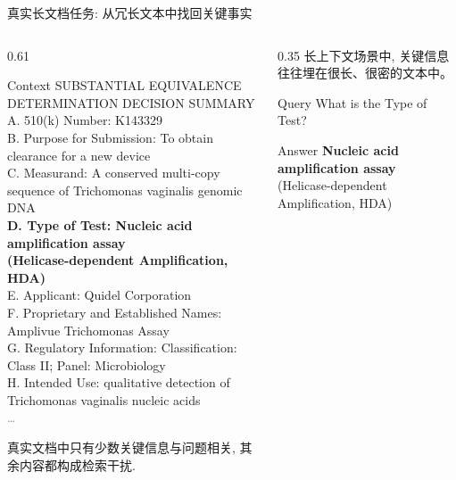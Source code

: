 
\begin{frame}
  \titlepage
\end{frame}

\begin{frame}{真实长文档任务: 从冗长文本中找回关键事实}
  \centering
  \begin{minipage}{0.92\textwidth}
  \small
  \begin{columns}[T,onlytextwidth]
    \begin{column}{0.61\linewidth}
      \begin{block}{Context}
        {\fontsize{5.4pt}{6.5pt}\selectfont\ttfamily
        SUBSTANTIAL EQUIVALENCE DETERMINATION DECISION SUMMARY\\
        A. 510(k) Number: K143329\\
        B. Purpose for Submission: To obtain clearance for a new device\\
        C. Measurand: A conserved multi-copy sequence of Trichomonas vaginalis genomic DNA\\
        \textcolor{scured}{\textbf{D. Type of Test: Nucleic acid amplification assay}}\\
        \textcolor{scured}{\textbf{\quad (Helicase-dependent Amplification, HDA)}}\\
        E. Applicant: Quidel Corporation\\
        F. Proprietary and Established Names: Amplivue Trichomonas Assay\\
        G. Regulatory Information: Classification: Class II; Panel: Microbiology\\
        H. Intended Use: qualitative detection of Trichomonas vaginalis nucleic acids\\
        \hfill\textcolor{gray}{\ldots}
        }
      \end{block}
      \vskip0.18cm
      {\footnotesize\color{gray}真实文档中只有少数关键信息与问题相关, 其余内容都构成检索干扰.}
    \end{column}

    \begin{column}{0.35\linewidth}
      \vskip0.08cm
      长上下文场景中, 关键信息往往埋在很长、很密的文本中。

      \vskip0.35cm
      \begin{block}{Query}
        \centering
        \large What is the Type of Test?
      \end{block}

      \vskip0.20cm
      \begin{block}{Answer}
        \centering
        {\bfseries\color{scured}Nucleic acid amplification assay}\\
        {\scriptsize\color{scured}(Helicase-dependent Amplification, HDA)}
      \end{block}
    \end{column}
  \end{columns}


\end{minipage}
\end{frame}
